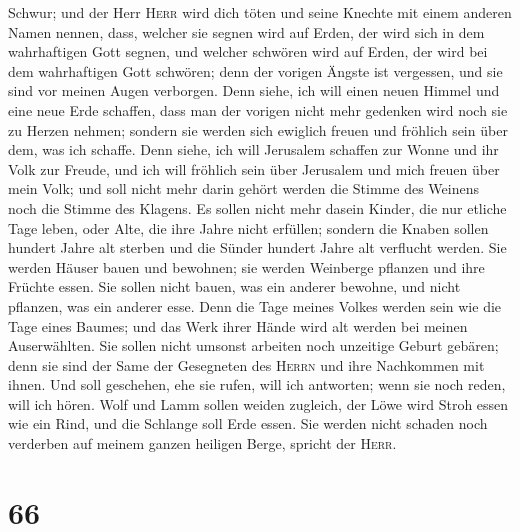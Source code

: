 Schwur; und der Herr \textsc{Herr} wird dich töten und seine Knechte mit
einem anderen Namen nennen,  dass, welcher sie segnen
wird auf Erden, der wird sich in dem wahrhaftigen Gott segnen, und
welcher schwören wird auf Erden, der wird bei dem wahrhaftigen Gott
schwören; denn der vorigen Ängste ist vergessen, und sie sind vor meinen
Augen verborgen.  Denn siehe, ich will einen neuen Himmel
und eine neue Erde schaffen, dass man der vorigen nicht mehr gedenken
wird noch sie zu Herzen nehmen;  sondern sie werden sich
ewiglich freuen und fröhlich sein über dem, was ich schaffe. Denn siehe,
ich will Jerusalem schaffen zur Wonne und ihr Volk zur Freude,
 und ich will fröhlich sein über Jerusalem und mich
freuen über mein Volk; und soll nicht mehr darin gehört werden die
Stimme des Weinens noch die Stimme des Klagens.  Es
sollen nicht mehr dasein Kinder, die nur etliche Tage leben, oder Alte,
die ihre Jahre nicht erfüllen; sondern die Knaben sollen hundert Jahre
alt sterben und die Sünder hundert Jahre alt verflucht werden.
 Sie werden Häuser bauen und bewohnen; sie werden
Weinberge pflanzen und ihre Früchte essen.  Sie sollen
nicht bauen, was ein anderer bewohne, und nicht pflanzen, was ein
anderer esse. Denn die Tage meines Volkes werden sein wie die Tage eines
Baumes; und das Werk ihrer Hände wird alt werden bei meinen
Auserwählten.  Sie sollen nicht umsonst arbeiten noch
unzeitige Geburt gebären; denn sie sind der Same der Gesegneten des
\textsc{Herrn} und ihre Nachkommen mit ihnen.  Und soll
geschehen, ehe sie rufen, will ich antworten; wenn sie noch reden, will
ich hören.  Wolf und Lamm sollen weiden zugleich, der
Löwe wird Stroh essen wie ein Rind, und die Schlange soll Erde essen.
Sie werden nicht schaden noch verderben auf meinem ganzen heiligen
Berge, spricht der \textsc{Herr}.

\hypertarget{section-65}{%
\section{66}\label{section-65}}

